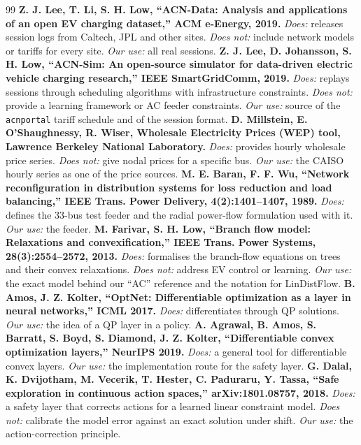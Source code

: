 \documentclass[11pt]{article}
\begin{document}
\begin{thebibliography}{99}
\textbf{Z. J. Lee, T. Li, S. H. Low, ``ACN-Data: Analysis and applications of an open EV charging dataset,'' ACM e-Energy, 2019.} \emph{Does:} releases session logs from Caltech, JPL and other sites. \emph{Does not:} include network models or tariffs for every site. \emph{Our use:} all real sessions.
\textbf{Z. J. Lee, D. Johansson, S. H. Low, ``ACN-Sim: An open-source simulator for data-driven electric vehicle charging research,'' IEEE SmartGridComm, 2019.} \emph{Does:} replays sessions through scheduling algorithms with infrastructure constraints. \emph{Does not:} provide a learning framework or AC feeder constraints. \emph{Our use:} source of the \texttt{acnportal} tariff schedule and of the session format.
\textbf{D. Millstein, E. O'Shaughnessy, R. Wiser, Wholesale Electricity Prices (WEP) tool, Lawrence Berkeley National Laboratory.} \emph{Does:} provides hourly wholesale price series. \emph{Does not:} give nodal prices for a specific bus. \emph{Our use:} the CAISO hourly series as one of the price sources.
\textbf{M. E. Baran, F. F. Wu, ``Network reconfiguration in distribution systems for loss reduction and load balancing,'' IEEE Trans. Power Delivery, 4(2):1401--1407, 1989.} \emph{Does:} defines the 33-bus test feeder and the radial power-flow formulation used with it. \emph{Our use:} the feeder.
\textbf{M. Farivar, S. H. Low, ``Branch flow model: Relaxations and convexification,'' IEEE Trans. Power Systems, 28(3):2554--2572, 2013.} \emph{Does:} formalises the branch-flow equations on trees and their convex relaxations. \emph{Does not:} address EV control or learning. \emph{Our use:} the exact model behind our ``AC'' reference and the notation for LinDistFlow.
\textbf{B. Amos, J. Z. Kolter, ``OptNet: Differentiable optimization as a layer in neural networks,'' ICML 2017.} \emph{Does:} differentiates through QP solutions. \emph{Our use:} the idea of a QP layer in a policy.
\textbf{A. Agrawal, B. Amos, S. Barratt, S. Boyd, S. Diamond, J. Z. Kolter, ``Differentiable convex optimization layers,'' NeurIPS 2019.} \emph{Does:} a general tool for differentiable convex layers. \emph{Our use:} the implementation route for the safety layer.
\textbf{G. Dalal, K. Dvijotham, M. Vecerik, T. Hester, C. Paduraru, Y. Tassa, ``Safe exploration in continuous action spaces,'' arXiv:1801.08757, 2018.} \emph{Does:} a safety layer that corrects actions for a learned linear constraint model. \emph{Does not:} calibrate the model error against an exact solution under shift. \emph{Our use:} the action-correction principle.

\end{thebibliography}
\end{document}
